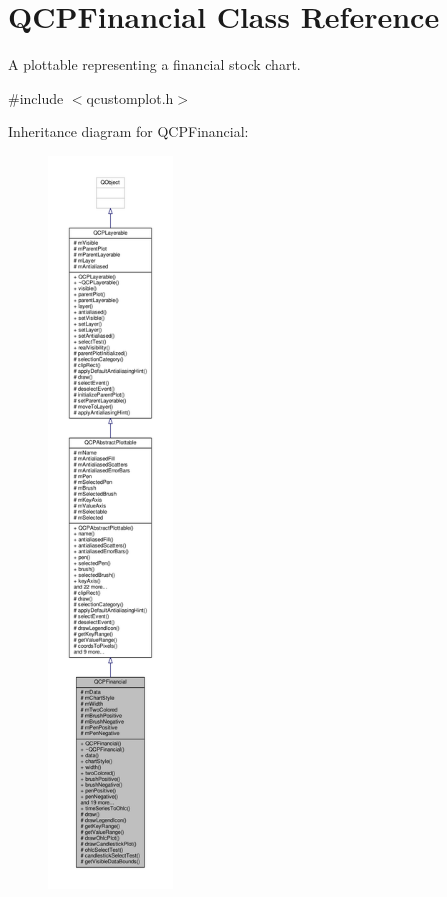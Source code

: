 \hypertarget{class_q_c_p_financial}{}\section{Q\+C\+P\+Financial Class Reference}
\label{class_q_c_p_financial}


A plottable representing a financial stock chart.  




{\ttfamily \#include $<$qcustomplot.\+h$>$}



Inheritance diagram for Q\+C\+P\+Financial\+:\nopagebreak
\begin{figure}[H]
\begin{center}
\leavevmode
\includegraphics[height=550pt]{class_q_c_p_financial__inherit__graph}
\end{center}
\end{figure}


